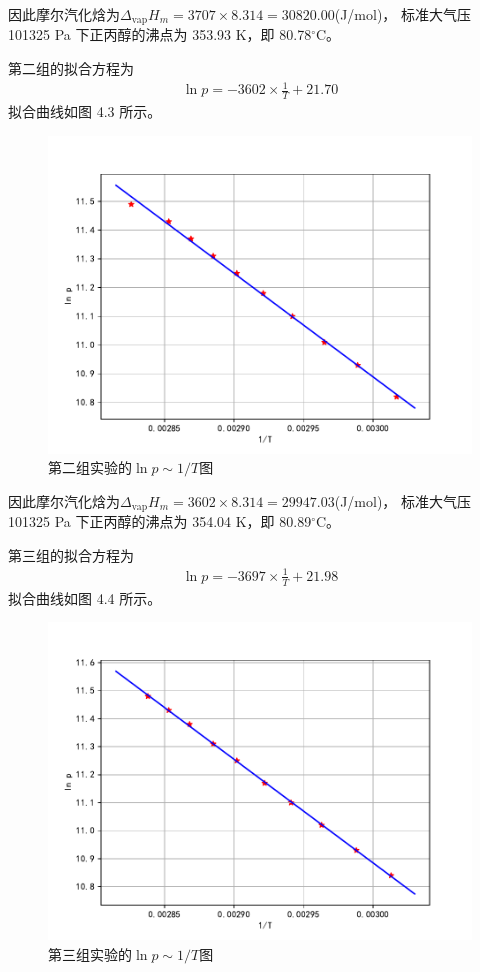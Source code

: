 \documentclass[12pt]{ctexart}
\numberwithin{equation}{section}
\begin{document}
因此摩尔汽化焓为$\Delta_{\text{vap}}H_m = 3707 \times 8.314 = 30820.00$(J/mol)，
标准大气压 101325 Pa 下正丙醇的沸点为 353.93 K，即 80.78$^\circ$C。

第二组的拟合方程为
\begin{align}
    \ln p = -3602 \times \frac{1}{T} + 21.70
    \tag*{(I.4)}
\end{align}
拟合曲线如图 4.3 所示。
\begin{figure}[!h]
    \centering
    \includegraphics[scale=0.8]{nihe_2.pdf}
    \caption{第二组实验的$\ln p \sim 1/T$图}
\end{figure}

因此摩尔汽化焓为$\Delta_{\text{vap}}H_m = 3602 \times 8.314 = 29947.03$(J/mol)，
标准大气压 101325 Pa 下正丙醇的沸点为 354.04 K，即 80.89$^\circ$C。

第三组的拟合方程为
\begin{align}
    \ln p = -3697 \times \frac{1}{T} + 21.98
    \tag*{(I.5)}
\end{align}
拟合曲线如图 4.4 所示。
\begin{figure}[!h]
    \centering
    \includegraphics[scale=0.8]{nihe_3.pdf}
    \caption{第三组实验的$\ln p \sim 1/T$图}
\end{figure}
\end{document}
